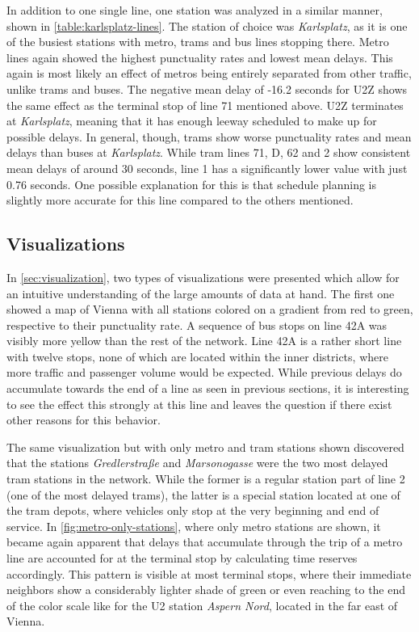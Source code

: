 In addition to one single line, one station was analyzed in a similar manner, shown in \cref{table:karlsplatz-lines}. The station of choice was \textit{Karlsplatz}, as it is one of the busiest stations with metro, trams and bus lines stopping there. Metro lines again showed the highest punctuality rates and lowest mean delays. This again is most likely an effect of metros being entirely separated from other traffic, unlike trams and buses. The negative mean delay of -16.2 seconds for U2Z shows the same effect as the terminal stop of line 71 mentioned above. U2Z terminates at \textit{Karlsplatz}, meaning that it has enough leeway scheduled to make up for possible delays. In general, though, trams show worse punctuality rates and mean delays than buses at \textit{Karlsplatz}. While tram lines 71, D, 62 and 2 show consistent mean delays of around 30 seconds, line 1 has a significantly lower value with just 0.76 seconds. One possible explanation for this is that schedule planning is slightly more accurate for this line compared to the others mentioned.


\subsection{Visualizations}
\label{discussion:vis}

In \cref{sec:visualization}, two types of visualizations were presented which allow for an intuitive understanding of the large amounts of data at hand. The first one showed a map of Vienna with all stations colored on a gradient from red to green, respective to their punctuality rate. A sequence of bus stops on line 42A was visibly more yellow than the rest of the network. Line 42A is a rather short line with twelve stops, none of which are located within the inner districts, where more traffic and passenger volume would be expected. While previous delays do accumulate towards the end of a line as seen in previous sections, it is interesting to see the effect this strongly at this line and leaves the question if there exist other reasons for this behavior.

The same visualization but with only metro and tram stations shown discovered that the stations \textit{Gredlerstraße} and \textit{Marsonogasse} were the two most delayed tram stations in the network. While the former is a regular station part of line 2 (one of the most delayed trams), the latter is a special station located at one of the tram depots, where vehicles only stop at the very beginning and end of service. In \cref{fig:metro-only-stations}, where only metro stations are shown, it became again apparent that delays that accumulate through the trip of a metro line are accounted for at the terminal stop by calculating time reserves accordingly. This pattern is visible at most terminal stops, where their immediate neighbors show a considerably lighter shade of green or even reaching to the end of the color scale like for the U2 station \textit{Aspern Nord}, located in the far east of Vienna.


